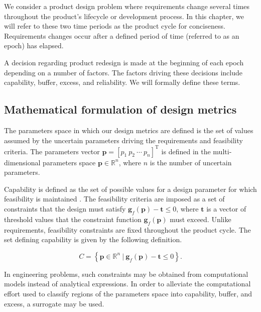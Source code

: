 We consider a product design problem where requirements change several times throughout the product's lifecycle or development process. In this chapter, we will refer to these two time periods as the product cycle for conciseness. Requirements changes occur after a defined period of time (referred to as an epoch) has elapsed.

A decision regarding product redesign is made at the beginning of each epoch depending on a number of factors. The factors driving these decisions include capability, buffer, excess, and reliability. We will formally define these terms.

\subsection{Mathematical formulation of design metrics} \label{subsec:designmetrics}

The parameters space in which our design metrics are defined is the set of values assumed by the uncertain parameters driving the requirements and feasibility criteria. The parameters vector $\mathbf{p} = \left[p_1 ~ p_2 ~ \cdots ~ p_n\right]^{\mathrm{T}}$ is defined in the multi-dimensional parameters space $\mathbf{p}\in\mathbb{R}^n$, where $n$ is the number of uncertain parameters.

Capability is defined as the set of possible values for a design parameter for which feasibility is maintained \cite{Eckert2019}. The feasibility criteria are imposed as a set of constraints that the design must satisfy $\mathbf{g}_{f}(\mathbf{p}) - \mathbf{t} \le 0$, where $\mathbf{t}$ is a vector of threshold values that the constraint function $\mathbf{g}_{f}(\mathbf{p})$ must exceed. Unlike requirements, feasibility constraints are fixed throughout the product cycle. The set defining capability is given by the following definition.

\begin{equation} \label{eq:capability}
	\textit{C} = \left\{\mathbf{p} \in \mathbb{R}^n~|~\mathbf{g}_{f}(\mathbf{p}) - \mathbf{t} \le 0\right\}.
\end{equation}

In engineering problems, such constraints may be obtained from computational models instead of analytical expressions. In order to alleviate the computational effort used to classify regions of the parameters space into capability, buffer, and excess, a surrogate may be used.

